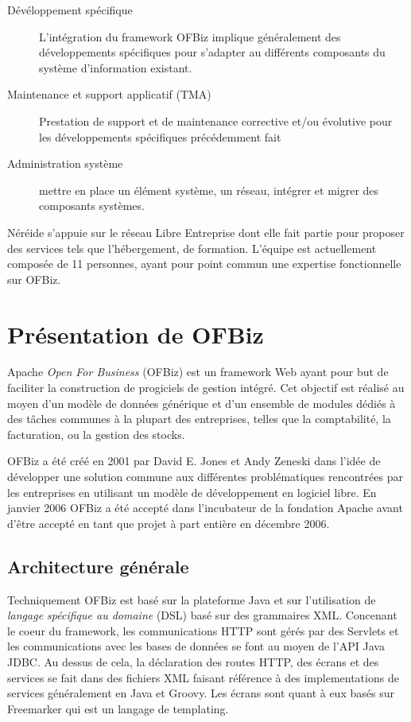 \documentclass[a4paper, 11pt]{report}
\begin{document}
\begin{description}
\item[Dévéloppement spécifique] L'intégration du framework OFBiz
  implique généralement des développements spécifiques pour s'adapter au
  différents composants du système d'information existant.
\item[Maintenance et support applicatif (TMA)] Prestation de support
  et de maintenance corrective et/ou évolutive pour les développements
  spécifiques précédemment fait
\item[Administration système] mettre en place un élément système, un
  réseau, intégrer et migrer des composants systèmes.
\end{description}

Néréide s'appuie sur le réseau Libre Entreprise dont elle fait partie
pour proposer des services tels que l'hébergement, de formation.
L'équipe est actuellement composée de 11 personnes, ayant pour point
commun une expertise fonctionnelle sur OFBiz.

\chapter{Présentation de OFBiz}

Apache \emph{Open For Business} (OFBiz) est un framework Web ayant
pour but de faciliter la construction de progiciels de gestion
intégré. Cet objectif est réalisé au moyen d'un modèle de données
générique et d'un ensemble de modules dédiés à des tâches communes à la
plupart des entreprises, telles que la comptabilité, la facturation,
ou la gestion des stocks.

OFBiz a été créé en 2001 par David E. Jones et Andy Zeneski dans
l'idée de développer une solution commune aux différentes
problématiques rencontrées par les entreprises en utilisant un modèle
de développement en logiciel libre. En janvier 2006 OFBiz a été accepté
dans l'incubateur de la fondation Apache avant d'être accepté en tant
que projet à part entière en décembre 2006.

\section{Architecture générale}

Techniquement OFBiz est basé sur la plateforme Java et sur
l'utilisation de \emph{langage spécifique au domaine} (DSL) basé sur
des grammaires XML. Concenant le coeur du framework, les
communications HTTP sont gérés par des Servlets \cite{chan2017servlet}
et les communications avec les bases de données se font au moyen de
l'API Java JDBC. Au dessus de cela, la déclaration des routes HTTP,
des écrans et des services se fait dans des fichiers XML faisant
référence à des implementations de services généralement en Java et
Groovy. Les écrans sont quant à eux basés sur Freemarker qui est un
langage de templating.
\end{document}

